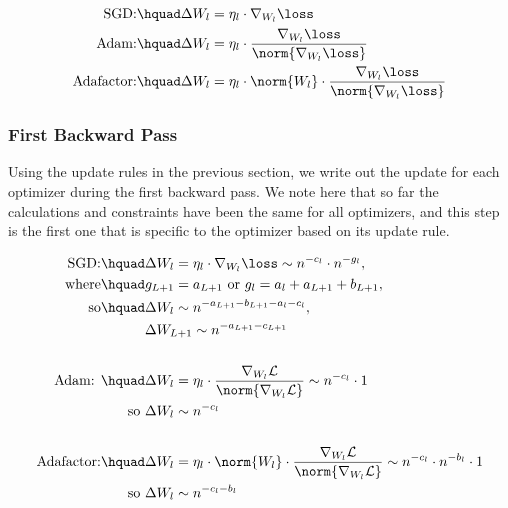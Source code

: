 \begin{align*}
    \textrm{SGD:}\hquad &\Delta W_l = \eta_l \cdot \nabla_{W_l} \loss\\
    \textrm{Adam:}\hquad &\Delta W_l = \eta_l \cdot \frac{\nabla_{W_l} \loss}{\norm{\nabla_{W_l} \loss}}\\
    \textrm{Adafactor:}\hquad &\Delta W_l = \eta_l \cdot \norm{W_l} \cdot \frac{\nabla_{W_l} \loss}{\norm{\nabla_{W_l} \loss}}\\
\end{align*}

\subsubsection{First Backward Pass}
\label{app:theory_first_backward}
Using the update rules in the previous section, we write out the update for each optimizer during the first backward pass. We note here that so far the calculations and constraints have been the same for all optimizers, and this step is the first one that is specific to the optimizer based on its update rule.

\begin{align*}
\textrm{SGD:} \hquad &\Delta W_l = \eta_l \cdot \nabla_{W_l} \loss \sim n^{-c_l} \cdot n^{-g_l},\\
\textrm{where}\hquad &g_{L+1} = a_{L+1} \textrm{ or } g_l = a_l + a_{L+1} + b_{L+1},\\
\textrm{so}\hquad &\Delta W_l \sim n^{-a_{L+1} - b_{L+1} - a_l - c_l},\\
&\Delta W_{L+1} \sim n^{-a_{L+1} - c_{L+1}}\\ \\
\textrm{Adam: }\hquad &\Delta W_l = \eta_l \cdot \frac{\nabla_{W_l} \mathcal{L}}{\norm{\nabla_{W_l} \mathcal{L}}} \sim n^{-c_l} \cdot 1 \\
  \textrm{so } &\Delta W_l \sim n^{-c_l}\\ \\
\textrm{Adafactor:}\hquad &\Delta W_l = \eta_l \cdot \norm{W_l} \cdot \frac{\nabla_{W_l} \mathcal{L}}{\norm{\nabla_{W_l} \mathcal{L}}} \sim n^{-c_l} \cdot n^{-b_l} \cdot 1\\
    \textrm{so } &\Delta W_l \sim n^{-c_l - b_l}\\
\end{align*}

